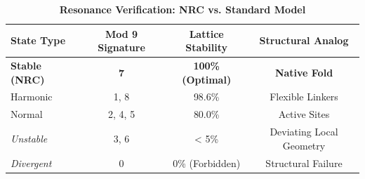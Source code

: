 \begin{table}[H]
	\centering
	\caption{\textbf{Resonance Verification: NRC vs. Standard Model}}
	\label{tab:mod_exclusion}
	\begin{tcolorbox}[colback=white, colframe=nrcblue, boxrule=0.3mm]
		\centering
		\begin{tabular}{@{}lccc@{}}
			\toprule
			\textbf{State Type} & \textbf{Mod 9 Signature} & \textbf{Lattice Stability} & \textbf{Structural Analog} \\ \midrule
			\textbf{Stable (NRC)} & \textbf{7} & \textbf{100\% (Optimal)} & \textbf{Native Fold} \\
			Harmonic & 1, 8 & 98.6\% & Flexible Linkers \\
			Normal & 2, 4, 5 & 80.0\% & Active Sites \\ \midrule
			\textit{Unstable} & 3, 6 & < 5\% & Deviating Local Geometry \\
			\textit{Divergent} & 0 & 0\% (Forbidden) & Structural Failure \\ \bottomrule
		\end{tabular}
	\end{tcolorbox}
\end{table}
